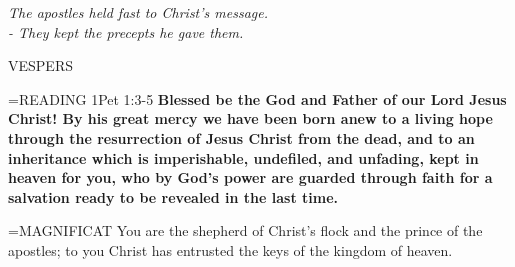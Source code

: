 \begin{center}
\textit{The apostles held fast to Christ’s message.\\
- They kept the precepts he gave them.}
\end{center}

\begin{flushleft}\normalsize VESPERS\\\end{flushleft}

\hangindent=\parindent \small{READING} 1Pet 1:3-5 \textbf{Blessed be the God and Father of our Lord Jesus
Christ! By his great mercy we have been born anew to a living hope
through the resurrection of Jesus Christ from the dead, and to an
inheritance which is imperishable, undefiled, and unfading, kept in
heaven for you, who by God’s power are guarded through faith for
a salvation ready to be revealed in the last time.\\}
 
\hangindent=\parindent \small{MAGNIFICAT  You are the shepherd of Christ’s flock and the prince of
the apostles; to you Christ has entrusted the keys of the kingdom of
heaven.\\}
 

